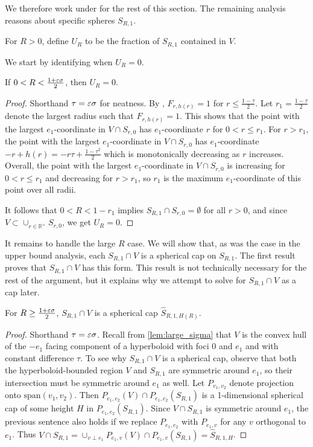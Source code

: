 We therefore work under  for the rest of this section. The remaining analysis reasons about specific spheres $S_{R,1}$.
\begin{definition}
\label{def:U_R}
    For $R > 0$, define $U_R$ to be the fraction of $S_{R,1}$ contained in $V$.
\end{definition}
We start by identifying when $U_R = 0$.
\begin{lemma}
\label{lem:U_R_0}
    If $0 < R < \frac{1+\varepsilon \sigma}{2}$, then $U_{R} = 0$. 
\end{lemma}
\begin{proof}
    Shorthand $\tau = \varepsilon \sigma$ for neatness. By , $F_{r,h(r)} = 1$ for $r \leq \frac{1-\tau}{2}$. Let $r_1 = \frac{1-\tau}{2}$ denote the largest radius such that $F_{r,h(r)} = 1$. This shows that the point with the largest $e_1$-coordinate in $V \cap S_{r,0}$ has $e_1$-coordinate $r$ for $0 < r \leq r_1$. For $r > r_1$, the point with the largest $e_1$-coordinate in $V \cap S_{r,0}$ has $e_1$-coordinate $-r + h(r) = -r\tau + \frac{1-\tau^2}{2}$ which is monotonically decreasing as $r$ increases. Overall, the point with the largest $e_1$-coordinate in $V \cap S_{r,0}$ is increasing for $0 < r \leq r_1$ and decreasing for $r > r_1$, so $r_1$ is the maximum $e_1$-coordinate of this point over all radii.
    
    It follows that $0 < R < 1 - r_{1}$ implies $S_{R,1} \cap S_{r,0} = \emptyset$ for all $r > 0$, and since $V \subset \cup_{r \in \mathbb{R}^{+}}S_{r,0}$, we get $U_{R} = 0$.
\end{proof}

It remains to handle the large $R$ case. We will show that, as was the case in the upper bound analysis, each $S_{R,1} \cap V$ is a spherical cap on $S_{R,1}$. The first result proves that $S_{R,1} \cap V$ has this form. This result is not technically necessary for the rest of the argument, but it explains why we attempt to solve for $S_{R,1} \cap V$ as a cap later.

\begin{lemma}
\label{lem:lower_bound_cap_exists}
    For $R \geq \frac{1+\varepsilon \sigma}{2}$, $S_{R,1} \cap V$ is a spherical cap $\hat S_{R,1,H(R)}$.
\end{lemma}
\begin{proof}
    Shorthand $\tau = \varepsilon \sigma$. Recall from \cref{lem:large_sigma} that $V$ is the convex hull of the $-e_1$ facing component of a hyperboloid with foci $0$ and $e_1$ and with constant difference $\tau$. To see why $S_{R,1} \cap V$ is a spherical cap, observe that both the hyperboloid-bounded region $V$ and $S_{R,1}$ are symmetric around $e_1$, so their intersection must be symmetric around $e_1$ as well. Let $P_{v_1, v_2}$ denote projection onto $\text{span}(v_1, v_2)$. Then $P_{e_1,e_2}(V) \cap P_{e_1,e_2}(S_{R,1})$ is a 1-dimensional spherical cap of some height $H$ in $P_{e_1,e_2}(S_{R,1})$. Since $V \cap S_{R,1}$ is symmetric around $e_1$, the previous sentence also holds if we replace $P_{e_1,e_2}$ with $P_{e_1, v}$ for any $v$ orthogonal to $e_1$. Thus $V \cap S_{R,1} = \cup_{v \perp e_1}P_{e_1,v}(V) \cap P_{e_1,v}(S_{R,1}) = \hat{S}_{R,1,H}$.
\end{proof}

